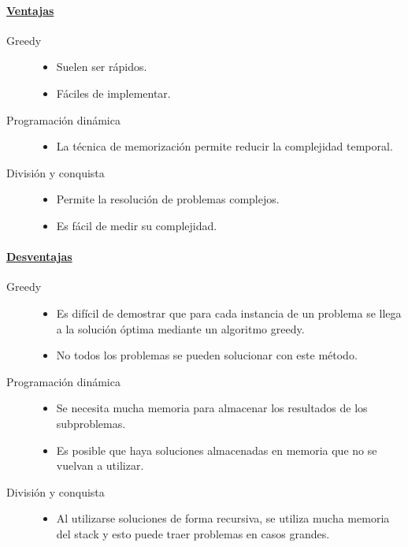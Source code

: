 \documentclass[../tp2_grupo404.tex]{subfiles}
\begin{document}
\paragraph{\underline{Ventajas}}
\begin{description}
    \item[Greedy] \leavevmode \begin{itemize}
        \item Suelen ser rápidos.
        \item Fáciles de implementar.
    \end{itemize}
 
    \item[Programación dinámica] \leavevmode \begin{itemize}
        \item La técnica de memorización permite reducir la complejidad temporal.
    \end{itemize}
 
    \item[División y conquista] \leavevmode \begin{itemize}
        \item Permite la resolución de problemas complejos.
        \item Es fácil de medir su complejidad.
    \end{itemize}
 
\end{description}

\paragraph{\underline{Desventajas}}
\begin{description}
    \item[Greedy] \leavevmode \begin{itemize}
        \item Es difícil de demostrar que para cada instancia de un problema se llega a la solución
            óptima mediante un algoritmo greedy.
        \item No todos los problemas se pueden solucionar con este método.
    \end{itemize}
 
    \item[Programación dinámica] \leavevmode \begin{itemize}
        \item Se necesita mucha memoria para almacenar los resultados de los subproblemas.
        \item Es posible que haya soluciones almacenadas en memoria que no se vuelvan a utilizar.
    \end{itemize}
 
    \item[División y conquista] \leavevmode \begin{itemize}
        \item Al utilizarse soluciones de forma recursiva, se utiliza mucha memoria
        del stack y esto puede traer problemas en casos grandes.
    \end{itemize}
 
\end{description}
\end{document}

